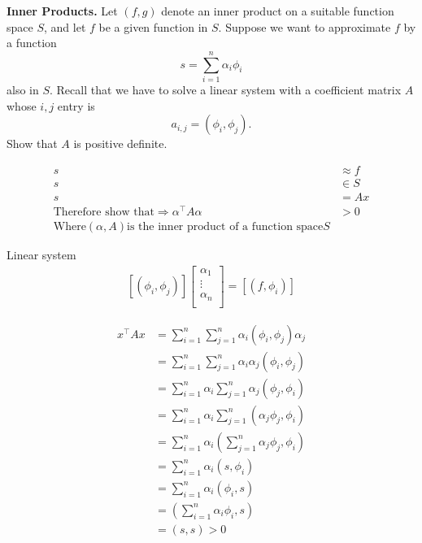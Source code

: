 \textbf{Inner Products.} Let $(f, g)$ denote an inner product on a
suitable function space $S$, and let $f$ be a given function in $S$.
Suppose we want to approximate $f$ by a function \[s = \sum_{i=1}^n
\alpha_i \phi_i\] also in $S$. Recall that we have to solve a linear
system with a coefficient matrix $A$ whose $i,j$ entry is \[a_{i,j} =
(\phi_i, \phi_j).\] Show that $A$ is positive definite.

{\color{blue}

\[
\begin{aligned}
s &\approx f \\
s &\in S \\
s &= A x \\
\text{Therefore show that}
\Rightarrow \alpha^\intercal A \alpha &> 0 \\
\text{Where} (\alpha, A) \text{is the inner product of a function
space} S
\end{aligned}
\]

Linear system
\[
\begin{aligned}
\left[ \left( \phi_i, \phi_j \right) \right] \left[
\begin{matrix}
\alpha_1 \\
\vdots \\
\alpha_n \\
\end{matrix}
\right] = \left[
\left( f, \phi_i \right)
\right]
\end{aligned}
\]


\[
\begin{aligned}
x^\intercal A x &= \sum_{i=1}^n \sum_{j=1}^n \alpha_i (\phi_i, \phi_j) \alpha_j \\
              &= \sum_{i=1}^n \sum_{j=1}^n \alpha_i \alpha_j (\phi_i, \phi_j) \\
              &= \sum_{i=1}^n \alpha_i \sum_{j=1}^n \alpha_j (\phi_j, \phi_i) \\
              &= \sum_{i=1}^n \alpha_i \sum_{j=1}^n (\alpha_j \phi_j, \phi_i) \\
              &= \sum_{i=1}^n \alpha_i (\sum_{j=1}^n \alpha_j \phi_j, \phi_i) \\
              &= \sum_{i=1}^n \alpha_i (s, \phi_i) \\
              &= \sum_{i=1}^n \alpha_i (\phi_i, s) \\
              &= (\sum_{i=1}^n \alpha_i \phi_i, s) \\
              &= (s, s) > 0 \\
\end{aligned}
\]
}
